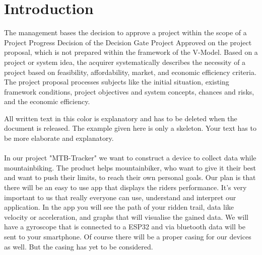 \documentclass[12pt]{article}
\theoremstyle{definition}
\newenvironment{explanation}{%
   \setlength{\parindent}{0pt}
   \itshape
   \color{blue}
}{}
\begin{document}
\section{Introduction}
\begin{explanation}
The management bases the decision to approve a project within the scope of a Project Progress Decision of the Decision Gate Project Approved on the project proposal, which is not prepared within the framework of the V-Model. Based on a project or system idea, the acquirer systematically describes the necessity of a project based on feasibility, affordability, market, and economic efficiency criteria.
The project proposal processes subjects like the initial situation, existing framework conditions, project objectives and system concepts, chances and risks, and the economic efficiency.

All written text in this color is explanatory and has to be deleted when the document is released. The example given here is only a skeleton. Your text has to be more elaborate and explanatory.
\end{explanation}
\\
\\
In our project "MTB-Tracker" we want to construct a device to collect data while mountainbiking. The product helps mountainbiker, who want to give it their best and want to push their limits, to reach their own personal goals. Our plan is that there will be an easy to use app that displays the riders performance. It's very important to us that really everyone can use, understand and interpret our application. In the app you will see the path of your ridden trail, data like velocity or acceleration, and graphs that will visualise the gained data. We will have a gyroscope that is connected to a ESP32 and via bluetooth data will be sent to your smartphone. Of course there will be a proper casing for our devices as well. But the casing has yet to be considered.
\pagebreak
\end{document}
